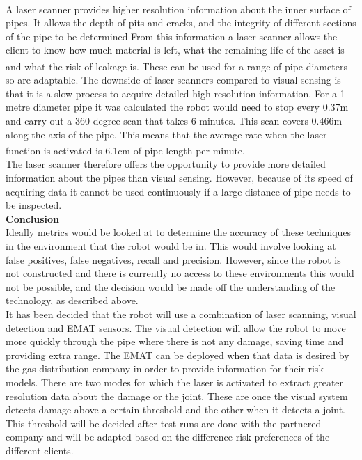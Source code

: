 \documentclass[11pt]{article}		%
\newcommand{\supercite}[1]{\textsuperscript{\cite{#1}}}		%
\begin{document}
	        \\
	        A laser scanner provides higher resolution information about the inner surface of pipes. %
	        It allows the depth of pits and cracks, and the integrity of different sections of the pipe to be determined
	        From this information a laser scanner allows the client to know how much material is left, what the remaining life of the asset is and what the risk of leakage is.\supercite{2g_robotics}
	        These can be used for a range of pipe diameters so are  adaptable. The downside of laser scanners compared to visual sensing is that it is a slow process to acquire detailed high-resolution information. 
	        For a 1 metre diameter pipe it was calculated the robot would need to stop every 0.37m and carry out a 360 degree scan that takes 6 minutes. 
	        This scan covers 0.466m along the axis of the pipe. 
	        This means that the average rate when the laser function is activated is 6.1cm of pipe length per minute. \supercite{2g_robotics}
	        \\
	        The laser scanner therefore offers the opportunity to provide more detailed information about the pipes than visual sensing. 
	        However, because of its speed of acquiring data it cannot be used continuously if a large distance of pipe needs to be inspected.
	        \\
	        \textbf{Conclusion}
	        \\
	        Ideally metrics would be looked at to determine the accuracy of these techniques in the environment that the robot would be in. 
	        This would involve looking at false positives, false negatives, recall and precision.
	        However, since the robot is not constructed and there is currently no access to these environments this would not be possible, and the decision would be made off the understanding of the technology, as described above.
	        \\
	        It has been decided that the robot will use a combination of laser scanning, visual detection and EMAT sensors.
	        The visual detection will allow the robot to move more quickly through the pipe where there is not any damage, saving time and providing extra range. 
	        The EMAT can be deployed when that data is desired by the gas distribution company in order to provide information for their risk models. 
	        There are two modes for which the laser is activated to extract greater resolution data about the damage or the joint. These are once the visual system detects damage  above a certain threshold and the other when it detects a joint.
	        This threshold will be decided after test runs are done with the partnered company and will be adapted based on the difference risk preferences of the different clients.
	    	\\
\end{document}
